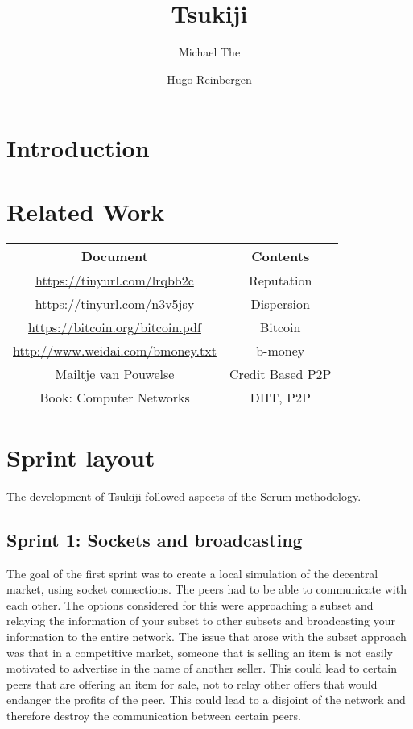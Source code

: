 \documentclass[]{article}
\title{Tsukiji}
\author{Michael The \and Hugo Reinbergen}
\begin{document}
\maketitle

\begin{abstract}

\end{abstract}

\section{Introduction}
\section{Related Work}
\begin{tabular}{|c|c|}
 \hline
 Document & Contents  \\
 \hline
 \url{https://tinyurl.com/lrqbb2c} & Reputation \\
 \url{https://tinyurl.com/n3v5jsy} & Dispersion \\
 \url{https://bitcoin.org/bitcoin.pdf} & Bitcoin \\
 \url{http://www.weidai.com/bmoney.txt} & b-money \\
 Mailtje van Pouwelse & Credit Based P2P \\
 Book: Computer Networks & DHT, P2P \\
 \hline
\end{tabular} 
\section{Sprint layout}
The development of Tsukiji followed aspects of the Scrum methodology.
\subsection{Sprint 1: Sockets and broadcasting}
The goal of the first sprint was to create a local simulation of the decentral market, using socket connections. The peers had to be able to communicate with each other. The options considered for this were approaching a subset and relaying the information of your subset to other subsets and broadcasting your information to the entire network. The issue that arose with the subset approach was that in a competitive market, someone that is selling an item is not easily motivated to advertise in the name of another seller. This could lead to certain peers that are offering an item for sale, not to relay other offers that would endanger the profits of the peer. This could lead to a disjoint of the network and therefore destroy the communication between certain peers.
\end{document}
